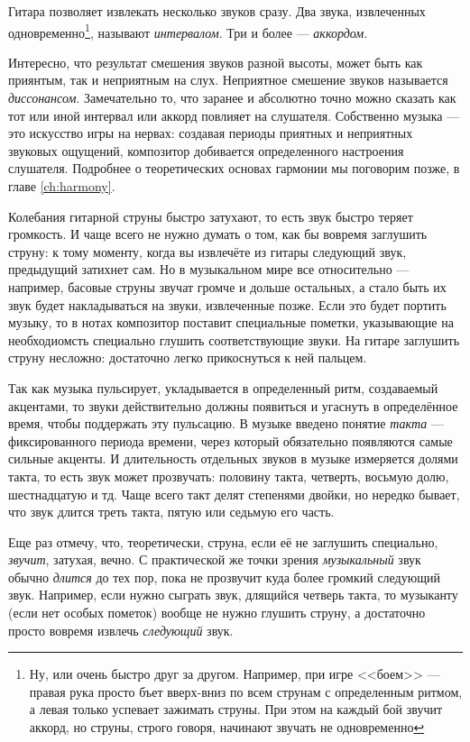 Гитара позволяет извлекать несколько звуков сразу. Два звука, извлеченных одновременно\footnote{Ну, или очень быстро друг за другом. Например, при игре <<боем>> --- правая рука просто бъет вверх-вниз по всем струнам с определенным ритмом, а левая только успевает зажимать струны. При этом на каждый бой звучит аккорд, но струны, строго говоря, начинают звучать не одновременно}, называют \emph{интервалом}. Три и более --- \emph{аккордом}.

Интересно, что результат смешения звуков разной высоты, может быть как приянтым, так и неприятным на слух. Неприятное смешение звуков называется \emph{диссонансом}. Замечательно то, что заранее и абсолютно точно можно сказать как тот или иной интервал или аккорд повлияет на слушателя. Собственно музыка --- это искусство игры на нервах: создавая периоды приятных и неприятных звуковых ощущений, композитор добивается определенного настроения слушателя. Подробнее о теоретических основах гармонии мы поговорим позже, в главе \ref{ch:harmony}.

Колебания гитарной струны быстро затухают, то есть звук быстро теряет громкость. И чаще всего не нужно думать о том, как бы вовремя заглушить струну: к тому моменту, когда вы извлечёте из гитары следующий звук, предыдущий затихнет сам. Но в музыкальном мире все относительно --- например, басовые струны звучат громче и дольше остальных, а стало быть их звук будет накладываться на звуки, извлеченные позже. Если это будет портить музыку, то в нотах композитор поставит специальные пометки, указывающие на необходиомсть специально глушить соответствующие звуки. На гитаре заглушить струну несложно: достаточно легко прикоснуться к ней пальцем.

Так как музыка пульсирует, укладывается в определенный ритм, создаваемый акцентами, то звуки действительно должны появиться и угаснуть в определённое время, чтобы поддержать эту пульсацию. В музыке введено понятие \emph{такта} --- фиксированного периода времени, через который обязательно появляются самые сильные акценты. И длительность отдельных звуков в музыке измеряется долями такта, то есть звук может прозвучать: половину такта, четверть, восьмую долю, шестнадцатую и тд. Чаще всего такт делят степенями двойки, но нередко бывает, что звук длится треть такта, пятую или седьмую его часть.

Еще раз отмечу, что, теоретически, струна, если её не заглушить специально, \emph{звучит}, затухая, вечно. С практической же точки зрения \emph{музыкальный} звук обычно \emph{длится} до тех пор, пока не прозвучит куда более громкий следующий звук. Например, если нужно сыграть звук, длящийся четверь такта, то музыканту (если нет особых пометок) вообще не нужно глушить струну, а достаточно просто вовремя извлечь \emph{следующий} звук.


